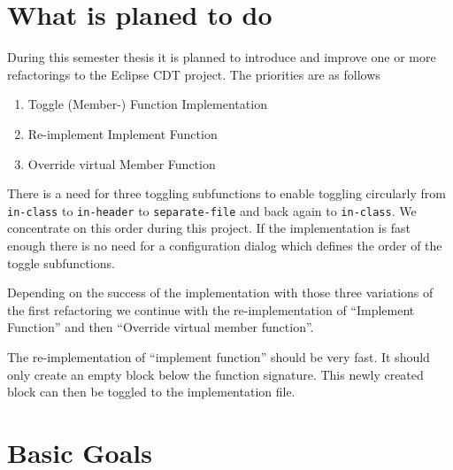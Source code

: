 \section{What is planed to do}

During this semester thesis it is planned to introduce and improve one or more
refactorings to the Eclipse CDT project. The priorities are as follows

\begin{enumerate}
\item Toggle (Member-) Function Implementation
\item Re-implement Implement Function
\item Override virtual Member Function
\end{enumerate}

There is a need for three toggling subfunctions to enable toggling circularly
from \texttt{in-class}
to \texttt{in-header} to \texttt{separate-file}  and back again to
\texttt{in-class}. We concentrate on this order during this project. If the
implementation is fast enough there is no need for a configuration dialog which
defines the order of the toggle subfunctions.\newline

Depending on the success of the implementation with those three variations of
the
first refactoring we continue with the re-implementation of  ``Implement
Function'' and then ``Override virtual member function''.\newline

The re-implementation of ``implement function'' should be very fast. It should
only create an empty block below the function signature. This newly created
block can then be toggled to the implementation file.

\section{Basic Goals}

